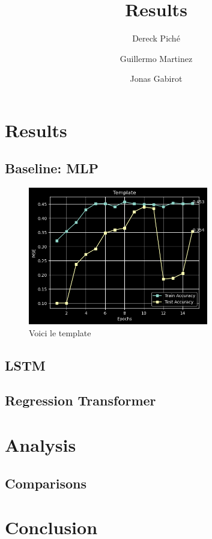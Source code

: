 \documentclass{article}
\title{Results}
\author
{
    Dereck Piché \and
    Guillermo Martinez \and
    Jonas Gabirot \and
}
\begin{document}
\maketitle

\section{Results}

\subsection{Baseline: MLP}

\begin{figure} \label{fig:template}
    \caption{Voici le template} \center
    \includegraphics[width=0.7\textwidth]{images/2023-03-28-10-29-38.png}
\end{figure}

\subsection{LSTM}

\subsection{Regression Transformer}


\section{Analysis}

\subsection{Comparisons}

\section{Conclusion}



\end{document}
